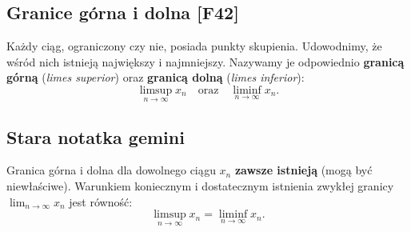 \subsection{Granice górna i dolna [F42]}

Każdy ciąg, ograniczony czy nie, posiada punkty skupienia. Udowodnimy, że wśród nich istnieją największy i najmniejszy. Nazywamy je odpowiednio \textbf{granicą górną} (\textit{limes superior}) oraz \textbf{granicą dolną} (\textit{limes inferior}):
\[
    \limsup_{n \to \infty} x_{n} \quad \text{oraz} \quad \liminf_{n \to \infty} x_{n}.
\]
\subsection{Stara notatka gemini}
\begin{theorem}
    Granica górna i dolna dla dowolnego ciągu $x_{n}$ \textbf{zawsze istnieją} (mogą być niewłaściwe).
    Warunkiem koniecznym i dostatecznym istnienia zwykłej granicy $\lim_{n \to \infty} x_n$ jest równość:
    \[ \limsup_{n \to \infty} x_{n} = \liminf_{n \to \infty} x_{n}. \]
\end{theorem}

